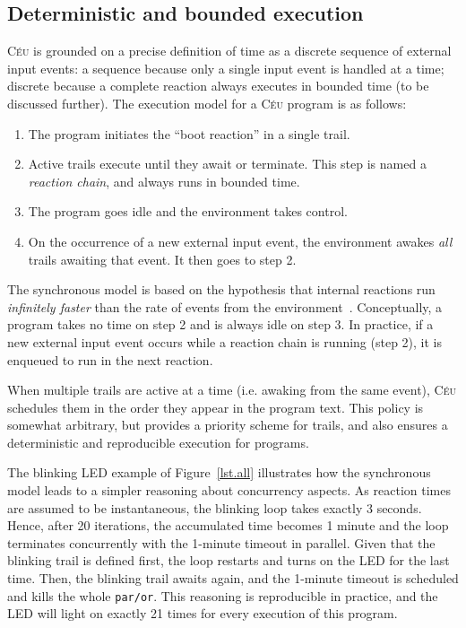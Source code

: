 \documentclass[10pt]{sensys-proc}
\newcommand{\CEU}{\textsc{C\'{e}u}\xspace}
\newcommand{\code}[1] {{\small{\texttt{#1}}}}
\begin{document}
\subsection{Deterministic and bounded execution}
\label{sec.ceu.det}


\CEU{} is grounded on a precise definition of time as a discrete sequence of 
external input events:
a sequence because only a single input event is handled at a time; discrete 
because a complete reaction always executes in bounded time (to be discussed 
further).
The execution model for a \CEU{} program is as follows:

\begin{enumerate}
\item The program initiates the ``boot reaction'' in a single trail.
\item Active trails execute until they await or terminate.
      This step is named a \emph{reaction chain}, and always runs in bounded 
      time.
\item The program goes idle and the environment takes control.
\item On the occurrence of a new external input event, the environment awakes 
      \emph{all} trails awaiting that event.
      It then goes to step 2.
\end{enumerate}

The synchronous model is based on the hypothesis that internal reactions run 
\emph{infinitely faster} than the rate of events from the 
environment~\cite{rp.hypothesis}.
Conceptually, a program takes no time on step 2 and is always idle on step 3.
In practice, if a new external input event occurs while a reaction chain is 
running (step 2), it is enqueued to run in the next reaction.


When multiple trails are active at a time (i.e. awaking from the same event), 
\CEU schedules them in the order they appear in the program text.
This policy is somewhat arbitrary, but provides a priority scheme for trails, 
and also ensures a deterministic and reproducible execution for programs.

The blinking LED example of Figure~\ref{lst.all} illustrates how the 
synchronous model leads to a simpler reasoning about concurrency aspects.
As reaction times are assumed to be instantaneous, the blinking loop takes 
exactly 3 seconds.
Hence, after 20 iterations, the accumulated time becomes 1 minute and the loop 
terminates concurrently with the 1-minute timeout in parallel.
Given that the blinking trail is defined first, the loop restarts and turns on 
the LED for the last time.
Then, the blinking trail awaits again, and the 1-minute timeout is scheduled 
and kills the whole \code{par/or}.
This reasoning is reproducible in practice, and the LED will light on exactly 
21 times for every execution of this program.
\end{document}
